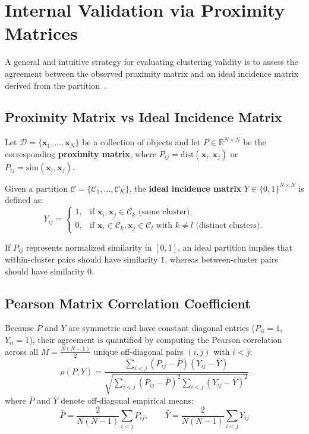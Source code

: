 \section{Internal Validation via Proximity Matrices}
\label{sec:dm-proximity-matrix-validity}

A general and intuitive strategy for evaluating clustering validity is to assess the agreement between the observed proximity matrix and an ideal incidence matrix derived from the partition~\cite{tan2018}.

\subsection{Proximity Matrix vs Ideal Incidence Matrix}
Let $\mathcal{D} = \{\mathbf{x}_1, \dots, \mathbf{x}_N\}$ be a collection of objects and let $P \in \mathbb{R}^{N \times N}$ be the corresponding \textbf{proximity matrix}, where $P_{ij} = \mathrm{dist}(\mathbf{x}_i, \mathbf{x}_j)$ or $P_{ij} = \mathrm{sim}(\mathbf{x}_i, \mathbf{x}_j)$.

Given a partition $\mathcal{C} = \{\mathcal{C}_1, \dots, \mathcal{C}_K\}$, the \textbf{ideal incidence matrix} $Y \in \{0, 1\}^{N \times N}$ is defined as:
\begin{equation}
\label{eq:dm-ideal-matrix-def-en}
Y_{ij} = 
\begin{cases}
1, & \text{if } \mathbf{x}_i, \mathbf{x}_j \in \mathcal{C}_k \text{ (same cluster)}, \\
0, & \text{if } \mathbf{x}_i \in \mathcal{C}_k, \mathbf{x}_j \in \mathcal{C}_l \text{ with } k \ne l \text{ (distinct clusters)}.
\end{cases}
\end{equation}

If $P_{ij}$ represents normalized similarity in $[0, 1]$, an ideal partition implies that within-cluster pairs should have similarity $1$, whereas between-cluster pairs should have similarity $0$.

\subsection{Pearson Matrix Correlation Coefficient}
Because $P$ and $Y$ are symmetric and have constant diagonal entries ($P_{ii} = 1$, $Y_{ii} = 1$), their agreement is quantified by computing the Pearson correlation across all $M = \frac{N(N-1)}{2}$ unique off-diagonal pairs $(i, j)$ with $i < j$:
\begin{equation}
\label{eq:dm-matrix-correlation-formula-en}
\rho(P, Y) = \frac{\sum_{i < j} \left(P_{ij} - \bar{P}\right)\left(Y_{ij} - \bar{Y}\right)}{\sqrt{\sum_{i < j} \left(P_{ij} - \bar{P}\right)^2 \sum_{i < j} \left(Y_{ij} - \bar{Y}\right)^2}}
\end{equation}
where $\bar{P}$ and $\bar{Y}$ denote off-diagonal empirical means:
\begin{equation}
\bar{P} = \frac{2}{N(N-1)} \sum_{i < j} P_{ij}, \qquad \bar{Y} = \frac{2}{N(N-1)} \sum_{i < j} Y_{ij}
\end{equation}

